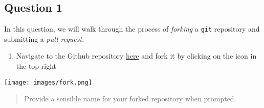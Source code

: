\documentclass[
  letterpaper,
  DIV=11,
  numbers=noendperiod]{scrartcl}
\providecommand{\tightlist}{%
  \setlength{\itemsep}{0pt}\setlength{\parskip}{0pt}}\usepackage{longtable,booktabs,array}
\begin{document}
\hypertarget{section}{%
\subsection{\texorpdfstring{}{    }}\label{section}}

\hypertarget{question-1}{%
\subsection{Question 1}\label{question-1}}

\begin{tcolorbox}[enhanced jigsaw, opacitybacktitle=0.6, opacityback=0, colframe=quarto-callout-tip-color-frame, toptitle=1mm, colbacktitle=quarto-callout-tip-color!10!white, colback=white, left=2mm, coltitle=black, title=\textcolor{quarto-callout-tip-color}{\faLightbulb}\hspace{0.5em}{20 points}, breakable, bottomtitle=1mm, rightrule=.15mm, titlerule=0mm, leftrule=.75mm, bottomrule=.15mm, toprule=.15mm, arc=.35mm]

\end{tcolorbox}

In this question, we will walk through the process of \emph{forking} a
\texttt{git} repository and submitting a \emph{pull request}.

\begin{enumerate}
\def\labelenumi{\arabic{enumi}.}
\tightlist
\item
  Navigate to the Github repository
  \href{https://github.com/psu-stat380/hw-1}{here} and fork it by
  clicking on the icon in the top right
\end{enumerate}

\texttt{[image: images/fork.png]}

\begin{quote}
Provide a sensible name for your forked repository when prompted.
\end{quote}
\end{document}
